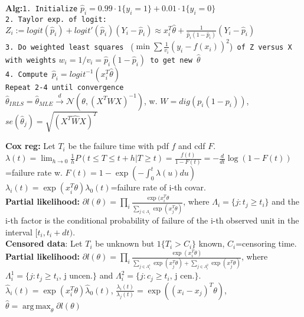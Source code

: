 \documentclass[11pt]{article}
\DeclareMathOperator*{\argmax}{arg\,max}
\begin{document}
\begin{multicols}{4}
\textbf{Alg:}\texttt{1. Initialize} $\hat{p}_i=0.99\cdot 1\{y_i=1\}+0.01\cdot 1\{y_i=0\}$\\
\texttt{2. Taylor exp. of logit:} $Z_i:=logit(\hat{p}_i)+logit'(\hat{p}_i)(Y_i-\hat{p}_i)\approx x_i^T\hat{\theta}+\frac{1}{\hat{p}_i(1-\hat{p}_i)}(Y_i-\hat{p}_i)$\\
\texttt{3. Do weighted least squares } ($\min\sum\frac{1}{v_i}(y_i-f(x_i))^2$)\texttt{ of Z versus X with weights} $w_i=1/v_i=\hat{p}_i(1-\hat{p}_i)$\texttt{ to get new }$\hat{\theta}$\\
\texttt{4. Compute }$\hat{p}_i=logit^{-1}(x_i^T\hat{\theta})$\\
\texttt{Repeat 2-4 until convergence}\\
$\hat{\theta}_{IRLS}=\hat{\theta}_{MLE}\stackrel{d}{\rightarrow}\mathcal{N}(\theta,(X^TWX)^{-1})$, w. $W=dig(p_i(1-p_i))$, $se(\hat{\theta}_j)=\sqrt{(X^T\hat{W}X)^T}$

\textbf{Cox reg:} Let $T_i$ be the failure time with pdf $f$ and cdf $F$.\\
$\lambda(t)=\lim_{h\rightarrow0}\frac{1}{h}P(t\leq T\leq t+h|T\geq t)=\frac{f(t)}{1-F(t)}=-\frac{d}{dt}\log(1-F(t))$=failure rate w. $F(t)=1-\exp(-\int^t_0\lambda(u)du)$\\

$\lambda_i(t)=\exp(x_i^T\theta)\lambda_0(t)$=failure rate of i-th covar.\\

\textbf{Partial likelihood:} $\partial l(\theta)=\prod_i\frac{\exp(x_i^T\theta}{\sum_{j\in \Lambda_i}\exp(x_j^T\theta)}$, where $\Lambda_i=\{j:t_j\geq t_i\}$ and the i-th factor is the conditional probability of failure of the i-th observed unit in the interval $[t_i,t_i+dt)$.\\

\textbf{Censored data}: Let $T_i$ be unknown but $1\{T_i>C_i\}$ known, $C_i$=censoring time.\\
\textbf{Partial likelihood:} $\partial l(\theta)=\prod_i\frac{\exp(x_i^T\theta)}{\sum_{j\in \Lambda^1_i}\exp(x_j^T\theta)+\sum_{j\in \Lambda^2_i}\exp(x_j^T\theta)}$, where $\Lambda^1_i=\{j:t_j\geq t_i\textrm{, j uncen.}\}$ and $\Lambda^2_i=\{j:c_j\geq t_i\textrm{, j cen.}\}$.\\

$\hat{\lambda}_i(t)=\exp(x_i^T\theta)\hat{\lambda}_0(t)$, $\frac{\lambda_i(t)}{\lambda_j(t)}=\exp((x_i-x_j)^T\theta)$, $\hat{\theta}=\argmax_\theta \partial l(\theta)$\\


\end{multicols}
\end{document}
